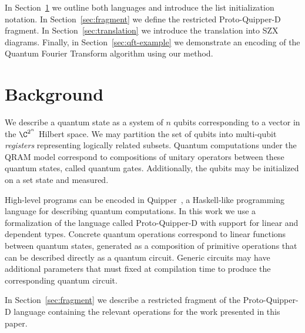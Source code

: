 In Section~\ref{sec:background} we outline both languages and introduce the list
initialization notation. In Section~\ref{sec:fragment} we define the restricted
Proto-Quipper-D fragment. In Section~\ref{sec:translation} we introduce the
translation into SZX diagrams. Finally, in Section~\ref{sec:qft-example} we
demonstrate an encoding of the Quantum Fourier Transform algorithm using our
method.

\section{Background}%
\label{sec:background}

We describe a quantum state as a system of $n$ qubits
corresponding to a vector in the $\C^{2^n}$ Hilbert space.
We may partition the set of qubits into multi-qubit \textit{registers}
representing logically related subsets.
Quantum computations under the QRAM model correspond to compositions of unitary
operators between these quantum states, called quantum gates.
Additionally, the qubits may be initialized on a set state and measured.

High-level programs can be encoded in Quipper~\cite{Green2013quipper},
a Haskell-like programming language for describing quantum computations.
In this work we use a formalization of the language called
Proto-Quipper-D\cite{fu_tutorial_2020} with support for linear and dependent types.
Concrete quantum operations correspond to linear functions between quantum states,
generated as a composition of primitive operations that can be described directly
as a quantum circuit.
Generic circuits may have additional parameters that must fixed at compilation time
to produce the corresponding quantum circuit.

In Section~\ref{sec:fragment} we describe a restricted fragment of the Proto-Quipper-D
language containing the relevant operations for the work presented in this paper.
